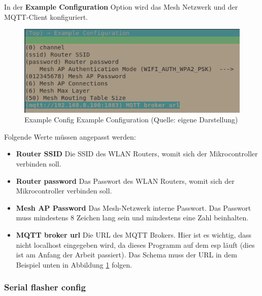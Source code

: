 In der \textbf{Example Configuration} Option wird das Mesh Netzwerk und der MQTT-Client konfiguriert.

\begin{figure}[H]
    \begin{center}
        \includegraphics[scale=1]{images/example_config_example_config.png}
        \caption{Example Config Example Configuration (Quelle: eigene Darstellung)}
        \label{abb:example_config_example_config}
    \end{center}
\end{figure}

Folgende Werte müssen angepasst werden:

\begin{itemize}
    \item \textbf{Router SSID} \newline
        Die SSID des WLAN Routers, womit sich der Mikrocontroller verbinden soll.
    \item \textbf{Router password} \newline
        Das Passwort des WLAN Routers, womit sich der Mikrocontroller verbinden soll.
    \item \textbf{Mesh AP Password} \newline
        Das Mesh-Netzwerk interne Passwort. Das Passwort muss mindestens 8 Zeichen lang sein und mindestens eine Zahl beinhalten.
    \item \textbf{MQTT broker url} \newline
        Die URL des MQTT Brokers. Hier ist es wichtig, dass nicht localhost eingegeben wird, da dieses Programm auf dem esp läuft (dies ist am Anfang der Arbeit passiert).\newline
        Das Schema muss der URL in dem Beispiel unten in Abbildung \ref{abb:example_config_example_config} folgen.
\end{itemize}

\pagebreak

\subsubsection{Serial flasher config}\label{sec:example-serial-flasher-config}

